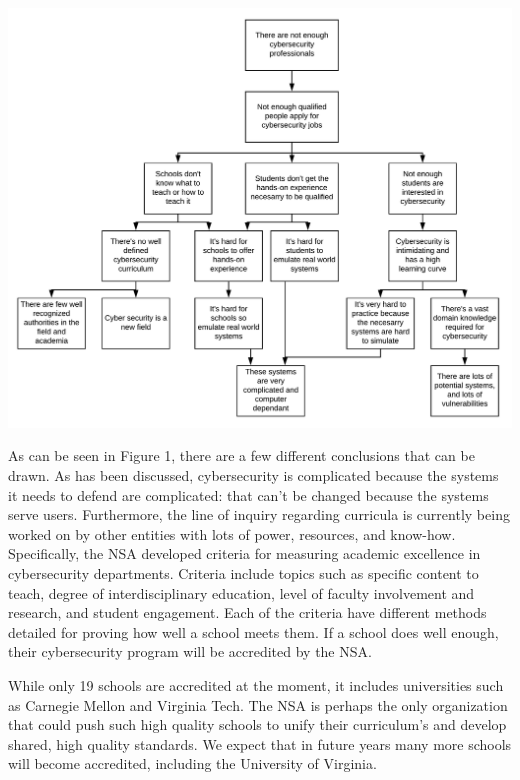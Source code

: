 \documentclass[openright]{report}
\begin{document}
\begin{center}
    \includegraphics[scale=0.34]{images/Why-Why.png}
\end{center}

\par As can be seen in Figure 1, there are a few different conclusions that can be drawn. As has been discussed, cybersecurity is complicated because the systems it needs to defend are complicated: that can't be changed because the systems serve users. Furthermore, the line of inquiry regarding curricula is currently being worked on by other entities with lots of power, resources, and know-how. Specifically, the NSA developed criteria for measuring academic excellence in cybersecurity departments. Criteria include topics such as specific content to teach, degree of interdisciplinary education, level of faculty involvement and research, and student engagement. Each of the criteria have different methods detailed for proving how well a school meets them. If a school does well enough, their cybersecurity program will be accredited by the NSA\cite{nsa_accred}. 

\par While only 19 schools are accredited at the moment, it includes universities such as Carnegie Mellon and Virginia Tech\cite{nsa_accred_schools}. The NSA is perhaps the only organization that could push such high quality schools to unify their curriculum's and develop shared, high quality standards. We expect that in future years many more schools will become accredited, including the University of Virginia. 
\end{document}
